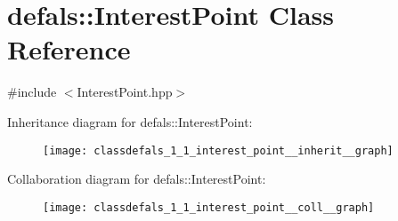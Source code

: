 \hypertarget{classdefals_1_1_interest_point}{}\section{defals\+:\+:Interest\+Point Class Reference}
\label{classdefals_1_1_interest_point}


{\ttfamily \#include $<$Interest\+Point.\+hpp$>$}



Inheritance diagram for defals\+:\+:Interest\+Point\+:\nopagebreak
\begin{figure}[H]
\begin{center}
\leavevmode
\texttt{[image: classdefals\_1\_1\_interest\_point\_\_inherit\_\_graph]}
\end{center}
\end{figure}


Collaboration diagram for defals\+:\+:Interest\+Point\+:\nopagebreak
\begin{figure}[H]
\begin{center}
\leavevmode
\texttt{[image: classdefals\_1\_1\_interest\_point\_\_coll\_\_graph]}
\end{center}
\end{figure}
